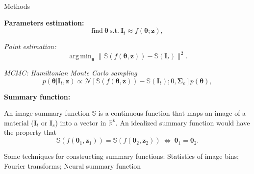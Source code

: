 \documentclass[final]{beamer}
\newlength{\twocolwid}
\newcommand{\Reals}{\mathbb{R}}
\newcommand{\summ}{\mathbb{S}}
\newcommand{\bz}{\bm{z}}
\newcommand{\btheta}{\bm{\theta}}
\newcommand{\target}{\bm{I}_t}
\newcommand{\synth}{\bm{I}_s}
\newcommand{\bsigma}{\bm{\Sigma}}
\DeclareMathOperator*{\argmin}{arg\,min}
\begin{document}
\begin{frame}[t]
\begin{columns}[t]
\begin{column}{\twocolwid}
\begin{block}{Methods}
{            \textbf{Parameters estimation:}
            \begin{equation*}
            	\mbox{find} \ \btheta \ \mbox{s.t.} \ \target \approx f(\btheta; \bz),
            \end{equation*}
            
            \textit{Point estimation:}
            \begin{equation*}
            	\argmin_{\btheta} \|\summ(f(\btheta, \bz)) - \summ(\target)\|^2.
            \end{equation*}
            
            \textit{MCMC: Hamiltonian Monte Carlo sampling}\cite{Neal2012,Betancourt2017}
            \begin{equation*}
            	p(\btheta | \target, \bz) \propto \mathcal{N}\left[\summ(f(\btheta, \bz)) - \summ(\target); 0, \bsigma_e\right] p(\btheta),
            \end{equation*}

            \vspace{0.5cm}

            \textbf{Summary function:}
            
            An image summary function $\summ$ is a continuous function that maps an image of a material ($\target$ or $\synth$) into a vector in $\Reals^k$. An idealized summary function would have the property that
            \begin{equation*}
            	\summ(f(\btheta_1, \bz_1)) = \summ(f(\btheta_2, \bz_2)) \ \Leftrightarrow \ \btheta_1 = \btheta_2.
            \end{equation*}
            
            Some techniques for constructing summary functions: Statistics of image bins; Fourier transforms; Neural summary function\cite{Gatys2015,Gatys2016}
        }
        \end{block}
        
        \vspace{0.5cm}
        

\end{column}
\end{columns}
\end{frame}
\end{document}
